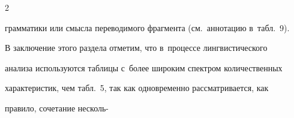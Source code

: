 \begin{multicols}{2}
\begin{enumerate}[(1)]
грамматики или смысла переводимого фрагмента (см.\ аннотацию в~табл.~9).


\end{enumerate}














  


  В заключение этого раздела отметим, что в~процессе лингвистического 


анализа используются таб\-ли\-цы с~более широким спектром количественных 


характеристик, чем табл.~5, так как одновременно рассматривается, как 


правило, сочетание несколь-\linebreak\vspace*{-12pt}





\pagebreak





\end{multicols}





